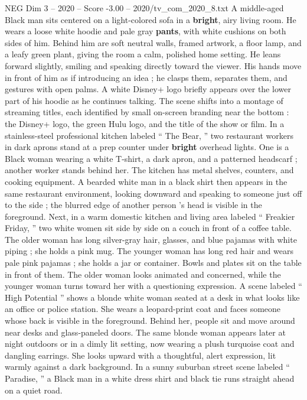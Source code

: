\begin{textsample}{NEG Dim 3 – 2020 – Score -3.00 – 2020/tv\_com\_2020\_8.txt}  \label{ex:f3_neg_028}
A middle-aged Black man sits centered on a light-colored sofa in a \textbf{bright}, airy living room.
He wears a loose white hoodie and pale gray \textbf{pants}, with white cushions on both sides of him.
Behind him are soft neutral walls, framed artwork, a floor lamp, and a leafy green plant, giving the room a calm, polished home setting.
He leans forward slightly, smiling and speaking directly toward the viewer.
His hands move in front of him as if introducing an idea ; he clasps them, separates them, and gestures with open palms.
A white Disney+ logo briefly appears over the lower part of his hoodie as he continues talking.
The scene shifts into a montage of streaming titles, each identified by small on-screen branding near the bottom : the Disney+ logo, the green Hulu logo, and the title of the show or film.
In a stainless-steel professional kitchen labeled “ The Bear, ” two restaurant workers in dark aprons stand at a prep counter under \textbf{bright} overhead lights.
One is a Black woman wearing a white T-shirt, a dark apron, and a patterned headscarf ; another worker stands behind her.
The kitchen has metal shelves, counters, and cooking equipment.
A bearded white man in a black shirt then appears in the same restaurant environment, looking downward and speaking to someone just off to the side ; the blurred edge of another person ’s head is visible in the foreground.
Next, in a warm domestic kitchen and living area labeled “ Freakier Friday, ” two white women sit side by side on a couch in front of a coffee table.
The older woman has long silver-gray hair, glasses, and blue pajamas with white piping ; she holds a pink mug.
The younger woman has long red hair and wears pale pink pajamas ; she holds a jar or container.
Bowls and plates sit on the table in front of them.
The older woman looks animated and concerned, while the younger woman turns toward her with a questioning expression.
A scene labeled “ High Potential ” shows a blonde white woman seated at a desk in what looks like an office or police station.
She wears a leopard-print coat and faces someone whose back is visible in the foreground.
Behind her, people sit and move around near desks and glass-paneled doors.
The same blonde woman appears later at night outdoors or in a dimly lit setting, now wearing a plush turquoise coat and dangling earrings.
She looks upward with a thoughtful, alert expression, lit warmly against a dark background.
In a sunny suburban street scene labeled “ Paradise, ” a Black man in a white dress shirt and black tie runs straight ahead on a quiet road.

\end{textsample}
